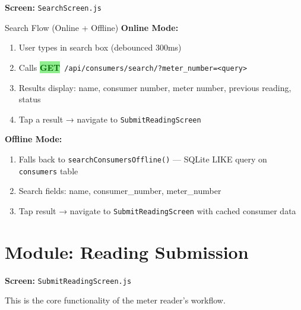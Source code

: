 \documentclass[12pt, a4paper]{report}
\newcommand{\httpget}{\colorbox{lightGreen}{\textcolor{darkGreen}{\textbf{\small GET}}}}
\begin{document}
\textbf{Screen:} \texttt{SearchScreen.js}

\begin{actorbox}{Search Flow (Online + Offline)}
\textbf{Online Mode:}
\begin{enumerate}
    \item User types in search box (debounced 300ms)
    \item Calls \httpget\ \texttt{/api/consumers/search/?meter\_number=<query>}
    \item Results display: name, consumer number, meter number, previous reading, status
    \item Tap a result → navigate to \texttt{SubmitReadingScreen}
\end{enumerate}

\vspace{0.5em}
\textbf{Offline Mode:}
\begin{enumerate}
    \item Falls back to \texttt{searchConsumersOffline()} — SQLite LIKE query on \texttt{consumers} table
    \item Search fields: name, consumer\_number, meter\_number
    \item Tap result → navigate to \texttt{SubmitReadingScreen} with cached consumer data
\end{enumerate}
\end{actorbox}

\section{Module: Reading Submission}

\textbf{Screen:} \texttt{SubmitReadingScreen.js}

This is the core functionality of the meter reader's workflow.
\end{document}
